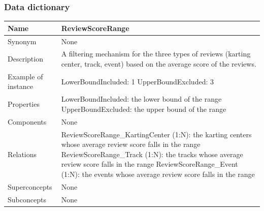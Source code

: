\documentclass{beamer}
\begin{document}
\begin{frame}
    \frametitle{Data dictionary}
    \begin{table}
    \tiny
    \begin{tabular}{|p{2cm}|p{6cm}|}
    \hline
    Name & \textbf{ReviewScoreRange} \\
    \hline
    Synonym & None \\
    \hline
    Description & A filtering mechanism for the three types of reviews (karting center, track, event)
    based on the average score of the reviews. \\
    \hline
    Example of instance &
    LowerBoundIncluded: 1 \newline
    UpperBoundExcluded: 3 \\
    \hline
    Properties &
    LowerBoundIncluded: the lower bound of the range \newline
    UpperBoundExcluded: the upper bound of the range \\
    \hline
    Components & None \\
    \hline
    Relations &
    ReviewScoreRange\_KartingCenter (1:N): the karting centers whose average review score falls in the range \newline
    ReviewScoreRange\_Track (1:N): the tracks whose average review score falls in the range \newline
    ReviewScoreRange\_Event (1:N): the events whose average review score falls in the range \\
    \hline
    Superconcepts & None \\
    \hline
    Subconcepts & None \\
    \hline
    \end{tabular}
    \end{table}
\end{frame}
\end{document}
